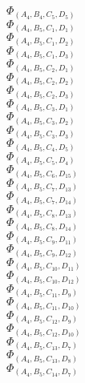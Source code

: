 \documentclass[14pt]{article}
\begin{document}
    $\Phi_{({A}_{4}, {B}_{4}, {C}_{5}, {D}_{5})}$ \\ 
    $\Phi_{({A}_{4}, {B}_{5}, {C}_{1}, {D}_{1})}$ \\ 
    $\Phi_{({A}_{4}, {B}_{5}, {C}_{1}, {D}_{2})}$ \\ 
    $\Phi_{({A}_{4}, {B}_{5}, {C}_{1}, {D}_{3})}$ \\ 
    $\Phi_{({A}_{4}, {B}_{5}, {C}_{2}, {D}_{1})}$ \\ 
    $\Phi_{({A}_{4}, {B}_{5}, {C}_{2}, {D}_{2})}$ \\ 
    $\Phi_{({A}_{4}, {B}_{5}, {C}_{2}, {D}_{3})}$ \\ 
    $\Phi_{({A}_{4}, {B}_{5}, {C}_{3}, {D}_{1})}$ \\ 
    $\Phi_{({A}_{4}, {B}_{5}, {C}_{3}, {D}_{2})}$ \\ 
    $\Phi_{({A}_{4}, {B}_{5}, {C}_{3}, {D}_{3})}$ \\ 
    $\Phi_{({A}_{4}, {B}_{5}, {C}_{4}, {D}_{5})}$ \\ 
    $\Phi_{({A}_{4}, {B}_{5}, {C}_{5}, {D}_{4})}$ \\ 
    $\Phi_{({A}_{4}, {B}_{5}, {C}_{6}, {D}_{15})}$ \\ 
    $\Phi_{({A}_{4}, {B}_{5}, {C}_{7}, {D}_{13})}$ \\ 
    $\Phi_{({A}_{4}, {B}_{5}, {C}_{7}, {D}_{14})}$ \\ 
    $\Phi_{({A}_{4}, {B}_{5}, {C}_{8}, {D}_{13})}$ \\ 
    $\Phi_{({A}_{4}, {B}_{5}, {C}_{8}, {D}_{14})}$ \\ 
    $\Phi_{({A}_{4}, {B}_{5}, {C}_{9}, {D}_{11})}$ \\ 
    $\Phi_{({A}_{4}, {B}_{5}, {C}_{9}, {D}_{12})}$ \\ 
    $\Phi_{({A}_{4}, {B}_{5}, {C}_{10}, {D}_{11})}$ \\ 
    $\Phi_{({A}_{4}, {B}_{5}, {C}_{10}, {D}_{12})}$ \\ 
    $\Phi_{({A}_{4}, {B}_{5}, {C}_{11}, {D}_{9})}$ \\ 
    $\Phi_{({A}_{4}, {B}_{5}, {C}_{11}, {D}_{10})}$ \\ 
    $\Phi_{({A}_{4}, {B}_{5}, {C}_{12}, {D}_{9})}$ \\ 
    $\Phi_{({A}_{4}, {B}_{5}, {C}_{12}, {D}_{10})}$ \\ 
    $\Phi_{({A}_{4}, {B}_{5}, {C}_{13}, {D}_{7})}$ \\ 
    $\Phi_{({A}_{4}, {B}_{5}, {C}_{13}, {D}_{8})}$ \\ 
    $\Phi_{({A}_{4}, {B}_{5}, {C}_{14}, {D}_{7})}$ \\ 
\end{document}
